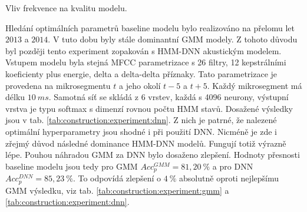 
\begin{table}[htpb]
  \centering
  \def\arraystretch{1.5}
  \caption{Vliv frekvence na kvalitu modelu.}
  \label{tab:construction:experiment:gmm}
\end{table}

Hledání optimálních parametrů baseline modelu bylo realizováno na přelomu let $2013$ a $2014$.
V tuto dobu byly stále dominantní GMM modely.
Z tohoto důvodu byl později tento experiment zopakován s HMM-DNN akustickým modelem.
Vstupem modelu byla stejná MFCC parametrizace s 26 filtry, 12 kepstrálními koeficienty plus energie, delta a delta-delta příznaky.
Tato parametrizace je provedena na mikrosegmentu $t$ a jeho okolí $t-5$ a $t+5$.
Každý mikrosegment má délku $10\ ms$.
Samotná síť se skládá z 6 vrstev, každá s 4096 neurony, výstupní vrstva je typu softmax s dimenzí rovnou počtu HMM stavů.
Dosažené výsledky jsou v tab. \ref{tab:construction:experiment:dnn}.
Z nich je patrné, že nalezené optimální hyperparametry jsou shodné i při použití DNN.
Nicméně je zde i zřejmý důvod následné dominance HMM-DNN modelů.
Fungují totiž výrazně lépe.
Pouhou náhradou GMM za DNN bylo dosaženo zlepšení.
Hodnoty přesnosti baseline modelu jsou tedy pro GMM $Acc_{p}^{GMM} = 81,20\ \%$ a pro DNN $Acc_{p}^{DNN} = 85,23\ \%$. To odpovídá zlepšení o $4\ \%$ absolutně oproti nejlepšímu GMM výsledku, viz tab. \ref{tab:construction:experiment:gmm} a \ref{tab:construction:experiment:dnn}.



